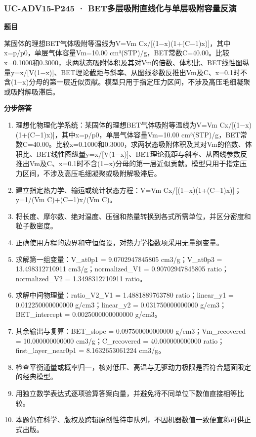 \documentclass[UTF8,11pt,a4paper]{ctexart}
\begin{document}
\subsubsection*{UC-ADV15-P245 · BET多层吸附直线化与单层吸附容量反演}
\noindent\textbf{题目}\par
某固体的理想BET气体吸附等温线为V=Vm Cx/[(1−x)(1+(C−1)x)]，其中x=p/p0，单层气体容量Vm=10.00 cm³(STP)/g，BET常数C=40.00。比较x=0.1000和0.3000，求两状态吸附体积及其对Vm的倍数、体积比、BET线性图纵量y=x/[V(1−x)]、BET理论截距与斜率、从图线参数反推出Vm及C、x=0.1时不含(1−x)分母的第一层近似贡献。模型只用于指定压力区间，不涉及高压毛细凝聚或吸附解吸滞后。\par
\medskip\noindent\textbf{分步解答}
\begin{enumerate}
\item 理想化物理化学系统：某固体的理想BET气体吸附等温线为V=Vm Cx/[(1−x)(1+(C−1)x)]，其中x=p/p0，单层气体容量Vm=10.00 cm³(STP)/g，BET常数C=40.00。比较x=0.1000和0.3000，求两状态吸附体积及其对Vm的倍数、体积比、BET线性图纵量y=x/[V(1−x)]、BET理论截距与斜率、从图线参数反推出Vm及C、x=0.1时不含(1−x)分母的第一层近似贡献。模型只用于指定压力区间，不涉及高压毛细凝聚或吸附解吸滞后。
\item 建立指定热力学、输运或统计状态方程：V=Vm Cx/[(1−x)(1+(C−1)x)]；y=1/(Vm C)+(C−1)x/(Vm C)。
\item 将长度、摩尔数、绝对温度、压强和热量转换到各式所需单位，并区分密度和粒子数密度。
\item 正确使用方程的边界和守恒假设，对热力学指数项采用无量纲变量。
\item 求解第一组变量：V\_at0p1 = 9.0702947845805 cm3/g；V\_at0p3 = 13.498312710911 cm3/g；normalized\_V1 = 0.90702947845805 ratio；normalized\_V2 = 1.3498312710911 ratio。
\item 求解中间物理量：ratio\_V2\_V1 = 1.4881889763780 ratio；linear\_y1 = 0.012250000000000 g/cm3；linear\_y2 = 0.031750000000000 g/cm3；BET\_intercept = 0.0025000000000000 g/cm3。
\item 其余输出与复算：BET\_slope = 0.097500000000000 g/cm3；Vm\_recovered = 10.000000000000 cm3/g；C\_recovered = 40.000000000000 ratio；first\_layer\_near0p1 = 8.1632653061224 cm3/g。
\item 检查平衡通量或概率归一，核对低压、高温与无驱动力极限是否符合题面限定的经典模型。
\item 用独立数学表达式逐项验算答案向量，并避免将不同单位下数值直接相等比较。
\item 本题仍在科学、版权及跨辑原创性待审队列，不因机器数值一致便宣称可供正式出版。
\end{enumerate}
\end{document}
